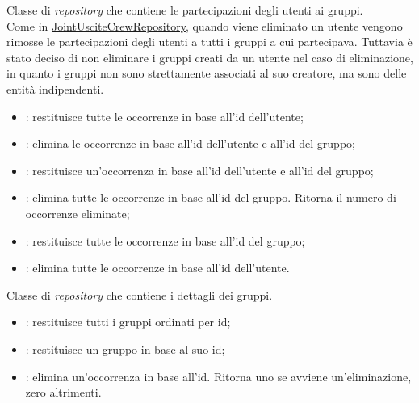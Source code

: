 \label{JointUtentiCrewRepository}
Classe di \textit{repository} che contiene le partecipazioni degli utenti ai
gruppi. \\
Come in \hyperref[JointUsciteCrewRepository]{JointUsciteCrewRepository}, quando
viene eliminato un utente vengono rimosse le partecipazioni degli utenti a
tutti i gruppi a cui partecipava. Tuttavia è stato deciso di non eliminare i
gruppi creati da un utente nel caso di eliminazione, in quanto i gruppi non
sono strettamente associati al suo creatore, ma sono delle entità indipendenti.
\begin{itemize}
    \item {}:
          restituisce tutte le occorrenze in base all'id dell'utente;
    \item {}:
          elimina le occorrenze in base all'id dell'utente e all'id del gruppo;
    \item {}: restituisce un'occorrenza in base all'id dell'utente e
          all'id del
          gruppo;
    \item {}: elimina tutte le occorrenze
          in base all'id del gruppo. Ritorna il numero di occorrenze eliminate;
    \item {}: restituisce
          tutte le occorrenze in base all'id del gruppo;
    \item {}: elimina tutte le
          occorrenze in base all'id dell'utente.

\end{itemize}

\label{CrewRepository}
Classe di \textit{repository} che contiene i dettagli dei gruppi. \\
\begin{itemize}
    \item {}: restituisce tutti i gruppi
          ordinati per id;
    \item {}: restituisce un gruppo in base al suo
          id;
    \item {}: elimina un'occorrenza in base
          all'id. Ritorna uno se avviene un'eliminazione, zero altrimenti.
\end{itemize}


